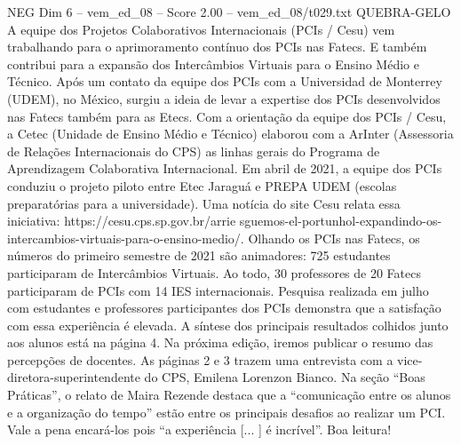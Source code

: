 \begin{textsample}{NEG Dim 6 – vem\_ed\_08 – Score 2.00 – vem\_ed\_08/t029.txt}  \label{ex:f6_neg_099}
QUEBRA-GELO A equipe dos Projetos Colaborativos Internacionais (PCIs / Cesu) vem trabalhando para o aprimoramento contínuo dos PCIs nas Fatecs.
E também contribui para a expansão dos Intercâmbios Virtuais para o Ensino Médio e Técnico.
Após um contato da equipe dos PCIs com a Universidad de Monterrey (UDEM), no México, surgiu a ideia de levar a expertise dos PCIs desenvolvidos nas Fatecs também para as Etecs.
Com a orientação da equipe dos PCIs / Cesu, a Cetec (Unidade de Ensino Médio e Técnico) elaborou com a ArInter (Assessoria de Relações Internacionais do CPS) as linhas gerais do Programa de Aprendizagem Colaborativa Internacional.
Em abril de 2021, a equipe dos PCIs conduziu o projeto piloto entre Etec Jaraguá e PREPA UDEM (escolas preparatórias para a universidade).
Uma notícia do site Cesu relata essa iniciativa: https://cesu.cps.sp.gov.br/arrie sguemos-el-portunhol-expandindo-os-intercambios-virtuais-para-o-ensino-medio/.
Olhando os PCIs nas Fatecs, os números do primeiro semestre de 2021 são animadores: 725 estudantes participaram de Intercâmbios Virtuais.
Ao todo, 30 professores de 20 Fatecs participaram de PCIs com 14 IES internacionais.
Pesquisa realizada em julho com estudantes e professores participantes dos PCIs demonstra que a satisfação com essa experiência é elevada.
A síntese dos principais resultados colhidos junto aos alunos está na página 4.
Na próxima edição, iremos publicar o resumo das percepções de docentes.
As páginas 2 e 3 trazem uma entrevista com a vice-diretora-superintendente do CPS, Emilena Lorenzon Bianco.
Na seção “Boas Práticas”, o relato de Maira Rezende destaca que a “comunicação entre os alunos e a organização do tempo” estão entre os principais desafios ao realizar um PCI.
Vale a pena encará-los pois “a experiência [... ] é incrível”.
Boa leitura!

\end{textsample}
